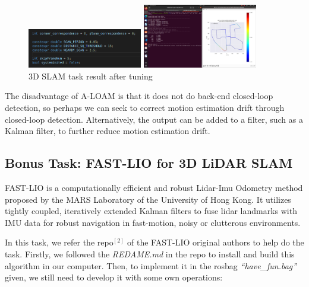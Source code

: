 \documentclass[hyperref]{article}
\theoremstyle{nonumberplain}
\begin{document}
\begin{figure}[H]
	\centering
	\begin{minipage}[t]{0.45\textwidth}
		\centering
		\includegraphics[width=5cm]{3.1b_rviz_parameterset.png}
	\end{minipage}
	\begin{minipage}[t]{0.45\textwidth}
		\centering
		\includegraphics[width=5cm]{3.1b_rviz_aftertuning.png}
	\end{minipage}
	\caption{3D SLAM task result after tuning}
	\label{fig8}
\end{figure} 

The disadvantage of A-LOAM is that it does not do back-end closed-loop detection, so perhaps we can seek to correct motion estimation drift through closed-loop detection. Alternatively, the output can be added to a filter, such as a Kalman filter, to further reduce motion estimation drift.


\subsection{Bonus Task: FAST-LIO for 3D LiDAR SLAM}
\hspace{1.0em}
FAST-LIO is a computationally efficient and robust Lidar-Imu Odometry method proposed by the MARS Laboratory of the University of Hong Kong. It utilizes tightly coupled, iteratively extended Kalman filters to fuse lidar landmarks with IMU data for robust navigation in fast-motion, noisy or clutterous environments.

In this task, we refer the repo$^{[2]}$ of the FAST-LIO original authors to help do the task. Firstly, we followed the \textit{REDAME.md} in the repo to install and build this algorithm in our computer. Then, to implement it in the rosbag \textit{“have\_fun.bag”} given, we still need to develop it with some own operations:
\end{document}
